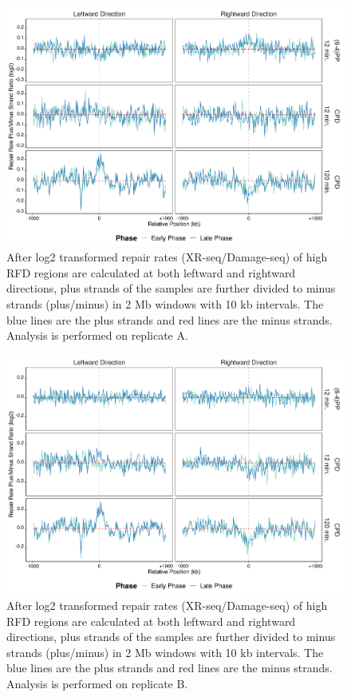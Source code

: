 \begin{figure}[H]
\begin{center}
\includegraphics[width=\textwidth]{Chapters/7_appendix/figures/supfig78}
\caption[Repair rate plus/minus ratio of high RFDs in 2 Mb (replicate A).]{After log2 transformed repair rates (XR-seq/Damage-seq) of high RFD regions are calculated at both leftward and rightward directions, plus strands of the samples are further divided to minus strands (plus/minus) in 2 Mb windows with 10 kb intervals. The blue lines are the plus strands and red lines are the minus strands. Analysis is performed on replicate A.}
\label{supfig:rrpm2000rfdA}
\end{center}
\end{figure}

\begin{figure}[H]
\begin{center}
\includegraphics[width=\textwidth]{Chapters/7_appendix/figures/supfig79}
\caption[Repair rate plus/minus ratio of high RFDs in 2 Mb (replicate B).]{After log2 transformed repair rates (XR-seq/Damage-seq) of high RFD regions are calculated at both leftward and rightward directions, plus strands of the samples are further divided to minus strands (plus/minus) in 2 Mb windows with 10 kb intervals. The blue lines are the plus strands and red lines are the minus strands. Analysis is performed on replicate B.}
\label{supfig:rrpm2000rfdB}
\end{center}
\end{figure}
